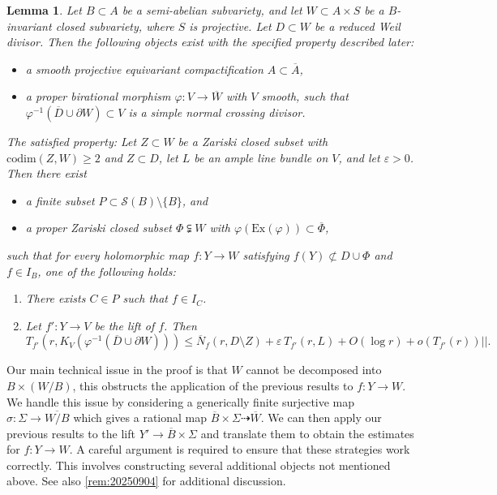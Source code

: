\documentclass[11pt,english]{smfart}
\theoremstyle{plain}
\newtheorem{lem}[thm]{Lemma}
\theoremstyle{definition}
\theoremstyle{remark}
\numberwithin{equation}{section}
\theoremstyle{plain}
\begin{document}
	
	\begin{lem}\label{lem:20220909gg}
Let $B \subset A$ be a semi-abelian subvariety, and let $W \subset A \times S$ be a $B$-invariant closed subvariety, where $S$ is projective. Let $D \subset W$ be a reduced Weil divisor.  
Then the following objects exist with the specified property described later: 
\begin{itemize}
    \item a smooth projective equivariant compactification $A \subset \overline{A}$,
    \item a proper birational morphism $\varphi: V \to \overline{W}$ with $V$ smooth, such that 
    \(\varphi^{-1}(\overline{D} \cup \partial W) \subset V\) is a simple normal crossing divisor.
\end{itemize}
The satisfied property: Let $Z \subset W$ be a Zariski closed subset with $\mathrm{codim}(Z,W) \ge 2$ and $Z \subset D$, let $L$ be an ample line bundle on $V$, and let $\varepsilon > 0$. Then there exist
\begin{itemize}
    \item a finite subset $P \subset \mathcal{S}(B) \setminus \{B\}$, and
    \item a proper Zariski closed subset $\Phi \subsetneqq W$ with $\varphi(\mathrm{Ex}(\varphi)) \subset \overline{\Phi}$,
\end{itemize}
such that for every holomorphic map $f: Y \to W$ satisfying $f(Y) \not\subset D \cup \Phi$ and $f \in I_B$, one of the following holds:
\begin{enumerate}
    \item There exists $C \in P$ such that $f \in I_C$.
    \item Let $f': Y \to V$ be the lift of $f$. Then
    \[
    T_{f'}(r, K_V(\varphi^{-1}(\overline{D} \cup \partial W))) \le \overline{N}_f(r, D \setminus Z) + \varepsilon\, T_{f'}(r,L) + O(\log r) + o(T_{f'}(r))||.
    \]
\end{enumerate}
\end{lem}


Our main technical issue in the proof is that $W$ cannot be decomposed into $B\times (W/B)$, this obstructs the application of the previous results to $f: Y \to W$.
We handle this issue by considering a generically finite surjective map $\sigma:\Sigma\to \overline{W/B}$ which gives a rational map $\overline{B}\times \Sigma\dashrightarrow \overline{W}$.
We can then apply our previous results to the lift
 $Y'\to \overline{B}\times \Sigma$ and translate them to obtain the estimates for $f: Y \to W$.
 A careful argument is required to ensure that these strategies work correctly.
 This involves constructing several additional objects not mentioned above.
 See also \cref{rem:20250904} for additional discussion.
\end{document}
